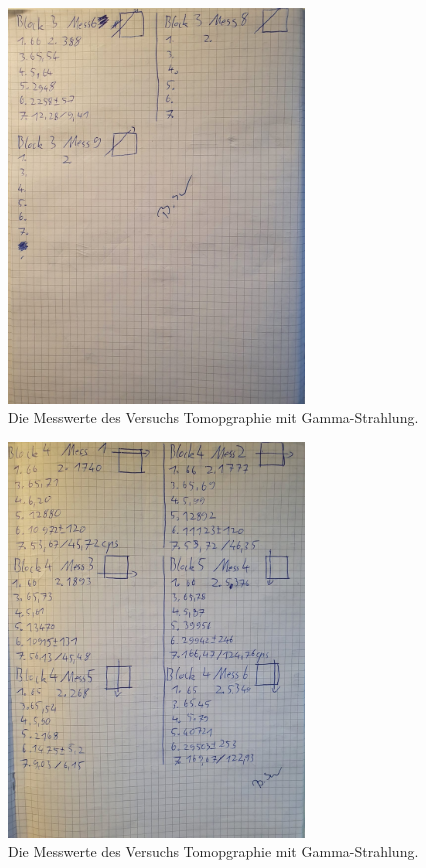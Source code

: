 \begin{figure}[h]
    \centering
    \includegraphics[width=0.7\textwidth]{latex/images/Mess4.jpeg}
    \caption{Die Messwerte des Versuchs Tomopgraphie mit Gamma-Strahlung.}
\end{figure}
\begin{figure}[h]
    \centering
    \includegraphics[width=0.7\textwidth]{latex/images/Mess5.jpeg}
    \caption{Die Messwerte des Versuchs Tomopgraphie mit Gamma-Strahlung.}
\end{figure}
